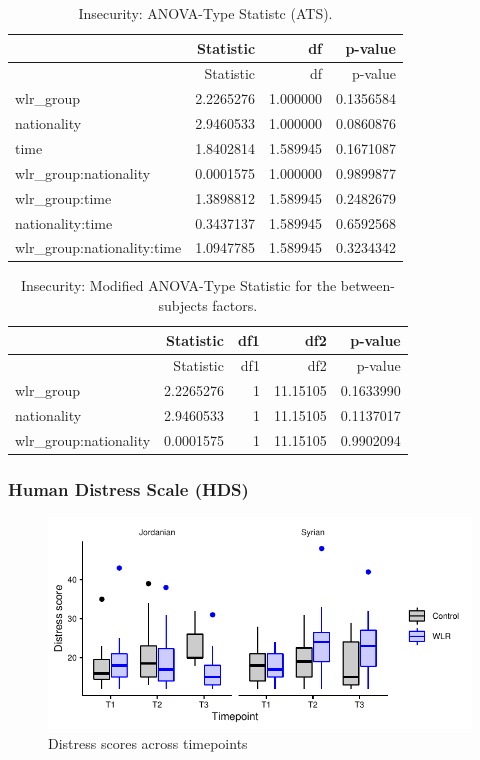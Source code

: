 \documentclass[]{article}
\begin{document}
\begin{longtable}[]{@{}lrrr@{}}
\caption{Insecurity: ANOVA-Type Statistc (ATS).}\tabularnewline
\toprule
& Statistic & df & p-value\tabularnewline
\midrule
\endfirsthead
\toprule
& Statistic & df & p-value\tabularnewline
\midrule
\endhead
wlr\_group & 2.2265276 & 1.000000 & 0.1356584\tabularnewline
nationality & 2.9460533 & 1.000000 & 0.0860876\tabularnewline
time & 1.8402814 & 1.589945 & 0.1671087\tabularnewline
wlr\_group:nationality & 0.0001575 & 1.000000 & 0.9899877\tabularnewline
wlr\_group:time & 1.3898812 & 1.589945 & 0.2482679\tabularnewline
nationality:time & 0.3437137 & 1.589945 & 0.6592568\tabularnewline
wlr\_group:nationality:time & 1.0947785 & 1.589945 &
0.3234342\tabularnewline
\bottomrule
\end{longtable}

\begin{longtable}[]{@{}lrrrr@{}}
\caption{Insecurity: Modified ANOVA-Type Statistic for the
between-subjects factors.}\tabularnewline
\toprule
& Statistic & df1 & df2 & p-value\tabularnewline
\midrule
\endfirsthead
\toprule
& Statistic & df1 & df2 & p-value\tabularnewline
\midrule
\endhead
wlr\_group & 2.2265276 & 1 & 11.15105 & 0.1633990\tabularnewline
nationality & 2.9460533 & 1 & 11.15105 & 0.1137017\tabularnewline
wlr\_group:nationality & 0.0001575 & 1 & 11.15105 &
0.9902094\tabularnewline
\bottomrule
\end{longtable}

\newpage

\hypertarget{human-distress-scale-hds}{%
\subsubsection{Human Distress Scale
(HDS)}\label{human-distress-scale-hds}}

\begin{figure}[H]

{\centering \includegraphics{WLR-analyses-report_files/figure-latex/unnamed-chunk-22-1} 

}

\caption{Distress scores across timepoints}\label{fig:unnamed-chunk-22}
\end{figure}
\end{document}
